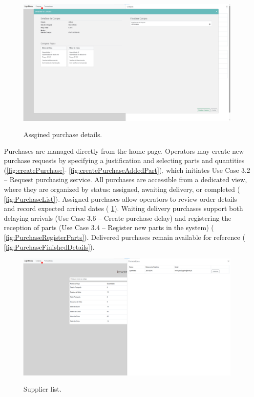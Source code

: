 \begin{figure}[h]
  \caption{Assgined purchase details.}
  \centering
  \includegraphics[width=\textwidth]{figs/Implementation/warehouse/PurchaseDetails}
  \label{fig:PurchaseDetails}
\end{figure}




Purchases are managed directly from the home page. Operators may create new purchase requests by specifying a justification and selecting parts and quantities (\ref{fig:createPurchase}- \ref{fig:createPurchaseAddedPart}), which initiates Use Case 3.2 – Request purchasing service. All purchases are accessible from a dedicated view, where they are organized by status: assigned, awaiting delivery, or completed ( \ref{fig:PurchaseList}). Assigned purchases allow operators to review order details and record expected arrival dates ( \ref{fig:PurchaseDetails}). Waiting delivery purchases support both delaying arrivals (Use Case 3.6 – Create purchase delay) and registering the reception of parts (Use Case 3.4 – Register new parts in the system) ( \ref{fig:PurchaseRegisterParts}). Delivered purchases remain available for reference ( \ref{fig:PurchaseFinishedDetails}).


\begin{figure}[h]
  \caption{Supplier list.}
  \centering
  \includegraphics[width=\textwidth]{figs/Implementation/warehouse/supplierList}
  \label{fig:supplierList}
\end{figure}


